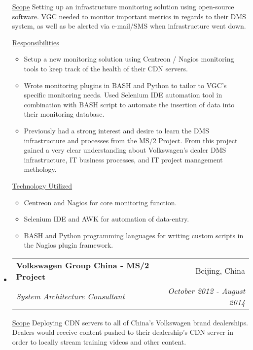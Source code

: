 \documentclass[a4paper,11pt]{article}
\makeatletter
\newcommand{\resitem}[1]{\item #1 \vspace{-2pt}}
\newcommand{\ressubheading}[4]{
\begin{tabular*}{6.5in}{l@{\cftdotfill{\cftsecdotsep}\extracolsep{\fill}}r}
        \textbf{#1} & #2 \\
        \textit{#3} & \textit{#4} \\
\end{tabular*}\vspace{-6pt}}
\makeatother
\begin{document}
\begin{itemize}
        \underline{Scope}
        \linebreak
        \linebreak
        Setting up an infrastructure monitoring solution using open-source software. VGC needed to monitor important metrics in regards to their DMS system, as well as be alerted via e-mail/SMS when infrastructure went down.

        \underline{Responsibilities}
        \begin{itemize}
            \resitem{Setup a new monitoring solution using Centreon / Nagios monitoring tools to keep track of the health of their CDN servers.}
            \resitem{Wrote monitoring plugins in BASH and Python to tailor to VGC's specific monitoring needs. Used Selenium IDE automation tool in combination with BASH script to automate the insertion of data into their monitoring database.}
            \resitem{Previously had a strong interest and desire to learn the DMS infrastructure and processes from the MS/2 Project. From this project gained a very clear understanding about Volkswagen's dealer DMS infrastructure, IT business processes, and IT project management methology.}
        \end{itemize}

        \underline{Technology Utilized}
        \begin{itemize}
            \resitem{Centreon and Nagios for core monitoring function.}
            \resitem{Selenium IDE and AWK for automation of data-entry.}
            \resitem{BASH and Python programming languages for writing custom scripts in the Nagios plugin framework.}
        \end{itemize}

    \item
        \ressubheading{Volkswagen Group China - MS/2 Project}{Beijing, China}{System Architecture Consultant}{October 2012 - August 2014}
        \linebreak
        \linebreak
        
        \underline{Scope}
        \linebreak
        \linebreak
        Deploying CDN servers to all of China's Volkswagen brand dealerships. Dealers would receive content pushed to their dealership's CDN server in order to locally stream training videos and other content.
        

\end{itemize}
\end{document}
